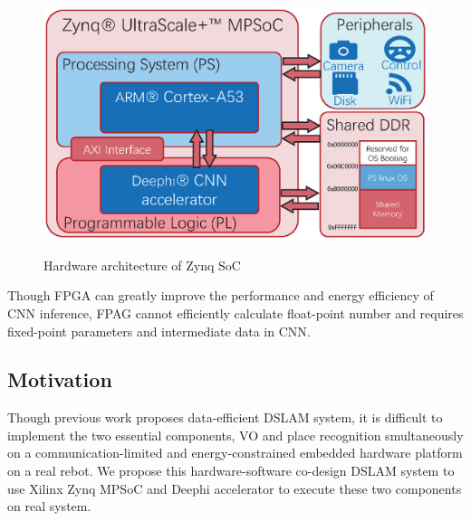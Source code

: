 \begin{figure}[thb]  
    \centering  
    {\includegraphics[width=0.95\linewidth]{fig/plps.eps}\label{fig:plps}} 
    \caption{Hardware architecture of Zynq SoC}
\end{figure}

Though FPGA can greatly improve the performance and energy efficiency of CNN inference, FPAG cannot efficiently calculate float-point number and requires fixed-point parameters and intermediate data in CNN.

\subsection{Motivation}
Though previous work \cite{Cieslewski:20187ee} proposes data-efficient DSLAM system, it is difficult to implement the two essential components, VO and place recognition smultaneously on a communication-limited and energy-constrained embedded hardware platform on a real rebot. We propose this hardware-software co-design DSLAM system to use Xilinx Zynq MPSoC and Deephi accelerator to execute these two components on real system.